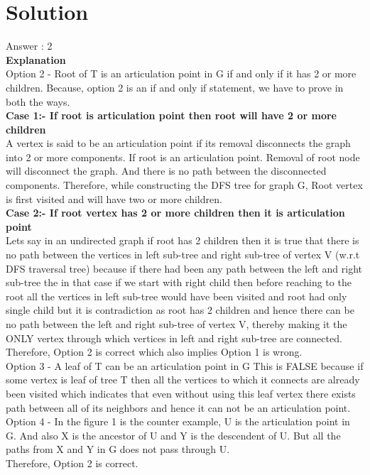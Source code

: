 \documentclass[journal,12pt,twocolumn]{IEEEtran}
\begin{document}
\section{Solution}
Answer : 2
\\
\textbf{Explanation}
\\
Option 2 - Root of T is an articulation point in G if and only if it has 2 or more children. Because, option 2 is an if and only if statement, we have to prove in both the ways. 
\\
\textbf{Case 1:- If root is articulation point then root will have 2 or more children}\\
A vertex is said to be an articulation point if its removal disconnects the graph into 2 or more components. If root is an articulation point. Removal of root node will disconnect the graph. And there is no path between the disconnected components. Therefore, while constructing the DFS tree for graph G, Root vertex is first visited and will have two or more children. 
\\  
\textbf{Case 2:- If root vertex has 2 or more children then it is articulation point}\\
Lets say in an undirected graph if root has 2 children then it is true that there is no path between the vertices in left sub-tree and right sub-tree of vertex V (w.r.t DFS traversal tree) because if there had been any path between the left and right sub-tree the in that case if we start with right child then before reaching to the root all the vertices in left sub-tree would have been visited and root had only single child but it is contradiction as root has 2 children and hence there can be no path between the left and right sub-tree of vertex V, thereby making it the ONLY vertex through which vertices in left and right sub-tree are connected.
\\ 
Therefore, Option 2 is correct which also implies Option 1 is wrong.\\
Option 3 - A leaf of T can be an articulation point in G
 This is FALSE because if some vertex is leaf of tree T then all the vertices to which it connects are already been visited which indicates that even without using this leaf vertex there exists path between all of its neighbors and hence it can not be an articulation point.
 \\
 Option 4 - In the figure 1 is the counter example, U is the articulation point in G. And also X is the ancestor of U and Y is the descendent of U. But all the paths from X and Y in G does not pass through U.
\\
Therefore, Option 2 is correct.\\
\end{document}
